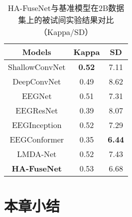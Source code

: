 \begin{table}[ht]
\end{table}

\begin{table}[ht]
    \centering
    \caption{HA-FuseNet与基准模型在2B数据集上的被试间实验结果对比（Kappa/SD）}
    \label{tab:2bcomparecrosssd}
    \begin{tabularx}{\textwidth}{CCC}
      \toprule
      Models & Kappa & SD \\
      \midrule
      ShallowConvNet\cite{schirrmeister2017deep} &\textbf{0.52}&7.11\\
      DeepConvNet\cite{schirrmeister2017deep} &0.49& 8.62 \\
      EEGNet\cite{lawhern2018eegnet} &0.51& 7.31\\
      EEGResNet\cite{HBM:HBM23730} &0.39 &8.07\\
      EEGInception\cite{zhang2021eeg} & 0.52 &7.29 \\
      EEGConformer\cite{song2022eeg} &0.35 &\textbf{6.44}\\
      LMDA-Net\cite{miao2023lmda} &0.52&7.43\\
      \midrule 
      \textbf{HA-FuseNet} &0.53&6.68\\
      \bottomrule
    \end{tabularx}
\end{table}

\section{本章小结}

